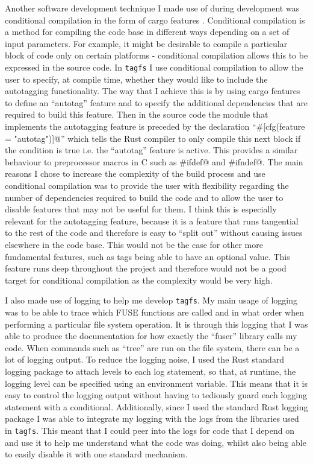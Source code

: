 Another software development technique I made use of during development was
conditional compilation in the form of cargo
features \cite{cargo-book}.
Conditional compilation is a method for compiling the code base in different
ways depending on a set of input parameters. For example, it might be desirable
to compile a particular block of code only on certain platforms - conditional
compilation allows this to be expressed in the source code. In \texttt{tagfs} I
use conditional compilation to allow the user to specify, at compile time,
whether they would like to include the autotagging functionality. The way that
I achieve this is by using cargo features to define an ``autotag'' feature and
to specify the additional dependencies that are required to build this feature.
Then in the source code the module that implements the autotagging feature is
preceded by the declaration ``\verb@#[cfg(feature = "autotag")]@'' which tells
the Rust compiler to only compile this next block if the condition is true i.e.
the ``autotag'' feature is active. This provides a similar behaviour to
preprocessor macros in C such as \verb@#ifdef@ and \verb@#ifndef@. The main
reasons I chose to increase the complexity of the build process and use
conditional compilation was to provide the user with flexibility regarding the
number of dependencies required to build the code and to allow the user to
disable features that may not be useful for them. I think this is especially
relevant for the autotagging feature, because it is a feature that runs
tangential to the rest of the code and therefore is easy to ``split out''
without causing issues elsewhere in the code base. This would not be the case
for other more fundamental features, such as tags being able to have an
optional value. This feature runs deep throughout the project and therefore
would not be a good target for conditional compilation as the complexity would
be very high.

I also made use of logging to help me develop \texttt{tagfs}. My main usage of
logging was to be able to trace which FUSE functions are called and in what
order when performing a particular file system operation. It is through this
logging that I was able to produce the documentation for how exactly the
``fuser'' library calls my code. When commands such as ``tree'' are run on the
file system, there can be a lot of logging output. To reduce the logging noise,
I used the Rust standard logging package to attach levels to each log
statement, so that, at runtime, the logging level can be specified using an
environment variable. This means that it is easy to control the logging output
without having to tediously guard each logging statement with a conditional.
Additionally, since I used the standard Rust logging package I was able to
integrate my logging with the logs from the libraries used in \texttt{tagfs}.
This meant that I could peer into the logs for code that I depend on and use it
to help me understand what the code was doing, whilst also being able to easily
disable it with one standard mechanism.

